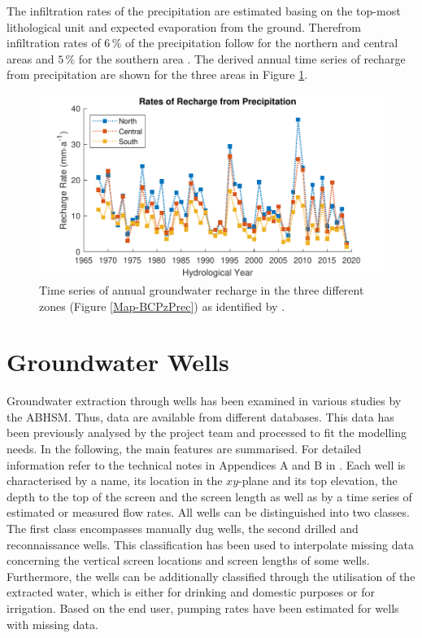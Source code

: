 The infiltration rates of the precipitation are estimated basing on the top-most lithological unit and expected evaporation from the ground. 
Therefrom infiltration rates of $6 \, \%$ of the precipitation follow for the northern and central areas and $5 \, \%$ for the southern area \parencite{Resing.2008}. 
The derived annual time series of recharge from precipitation are shown for the three areas in Figure \ref{Fig-RechPrec}.

\begin{figure}[h]
    \centering
    \includegraphics{./img/Fig-PrecRecharge.pdf}
    \caption{Time series of annual groundwater recharge in the three different zones (Figure \ref{Map-BCPzPrec}) as identified by \cite{Horn.2021}.}
    \label{Fig-RechPrec}
\end{figure}


\section{Groundwater Wells}
\label{Sec-GWWells}

Groundwater extraction through wells has been examined in various studies by the ABHSM. 
Thus, data are available from different databases. 
This data has been previously analysed by the project team and processed to fit the modelling needs. 
In the following, the main features are summarised. 
For detailed information refer to the technical notes in Appendices A and B in \textcite{Horn.2021}. 
Each well is characterised by a name, its location in the $xy$-plane and its top elevation, the depth to the top of the screen and the screen length as well as by a time series of estimated or measured flow rates. 
All wells can be distinguished into two classes. 
The first class encompasses manually dug wells, the second drilled and reconnaissance wells. 
This classification has been used to interpolate missing data concerning the vertical screen locations and screen lengths of some wells. 
Furthermore, the wells can be additionally classified through the utilisation of the extracted water, which is either for drinking and domestic purposes or for irrigation. 
Based on the end user, pumping rates have been estimated for wells with missing data.

